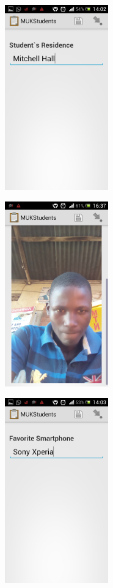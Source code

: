 \documentclass{article}
\begin{document}
\graphicspath{{ODKprojectReport/}}
\includegraphics[width = 5cm , height = 8cm ]{residence}
\graphicspath{{ODKprojectReport/}}
\includegraphics[width = 5cm , height = 8cm ]{image}
\graphicspath{{ODKprojectReport/}}
\includegraphics[width = 5cm , height = 8cm ]{favoriteSmartphone}
\end{document}
